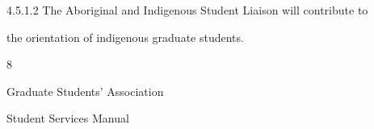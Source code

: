    4.5.1.2     The Aboriginal and Indigenous  Student Liaison will contribute to  

               the orientation of indigenous graduate students.   



                                                     8  



                                   Graduate Students’ Association  



                                        Student Services Manual  



  

